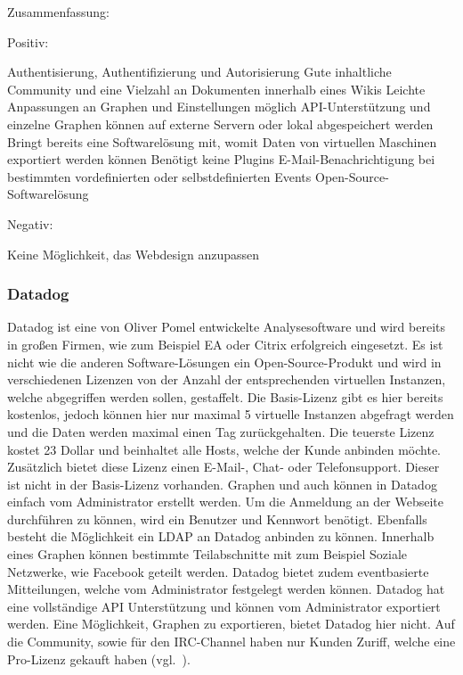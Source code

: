 Zusammenfassung:

Positiv:

\begin{outline}
  \1 Authentisierung, Authentifizierung und Autorisierung
  \1 Gute inhaltliche Community und eine Vielzahl an Dokumenten innerhalb
  eines Wikis
  \1 Leichte Anpassungen an Graphen und Einstellungen möglich
  \1 \gls{API}\hyp{}Unterstützung
  \1  und einzelne Graphen können auf externe
  Servern oder lokal abgespeichert werden
  \1 Bringt bereits eine Softwarelösung mit, womit Daten von virtuellen
  Maschinen exportiert werden können
  \1 Benötigt keine Plugins
  \1 E\hyp{}Mail\hyp{}Benachrichtigung bei bestimmten vordefinierten oder
  selbstdefinierten Events
  \1 Open\hyp{}Source\hyp{}Softwarelösung
\end{outline}

Negativ:

\begin{outline}
  \1 Keine Möglichkeit, das Webdesign anzupassen
\end{outline}
\mr%

\subsubsection{Datadog}
\label{subsubsec:datadog}
Datadog ist eine von Oliver Pomel entwickelte Analysesoftware und wird bereits
in großen Firmen, wie zum Beispiel EA oder Citrix erfolgreich eingesetzt. Es
ist nicht wie die anderen Software\hyp{}Lösungen ein
Open\hyp{}Source\hyp{}Produkt und wird in verschiedenen Lizenzen von der Anzahl
der entsprechenden virtuellen Instanzen, welche abgegriffen werden sollen,
gestaffelt. Die Basis\hyp{}Lizenz gibt es hier bereits kostenlos, jedoch können
hier nur maximal 5 virtuelle Instanzen abgefragt werden und die Daten werden
maximal einen Tag zurückgehalten. Die teuerste Lizenz kostet 23 Dollar und
beinhaltet alle Hosts, welche der Kunde anbinden möchte. Zusätzlich bietet
diese Lizenz einen E\hyp{}Mail\hyp{}, Chat\hyp{} oder Telefonsupport. Dieser
ist nicht in der Basis\hyp{}Lizenz vorhanden. Graphen und auch
 können in Datadog einfach vom Administrator
erstellt werden. Um die Anmeldung an der Webseite durchführen zu können, wird
ein Benutzer und Kennwort benötigt. Ebenfalls besteht die Möglichkeit ein
\gls{LDAP} an Datadog anbinden zu können. Innerhalb eines Graphen können
bestimmte Teilabschnitte mit zum Beispiel Soziale Netzwerke, wie Facebook
geteilt werden. Datadog bietet zudem eventbasierte Mitteilungen, welche vom
Administrator festgelegt werden können. Datadog hat eine vollständige \gls{API}
Unterstützung und  können vom Administrator
exportiert werden. Eine Möglichkeit, Graphen zu exportieren, bietet Datadog
hier nicht. Auf die Community, sowie für den \gls{IRC-Channel}  haben nur
Kunden Zuriff, welche eine Pro\hyp{}Lizenz gekauft haben (vgl.~\cite{datadog}).

